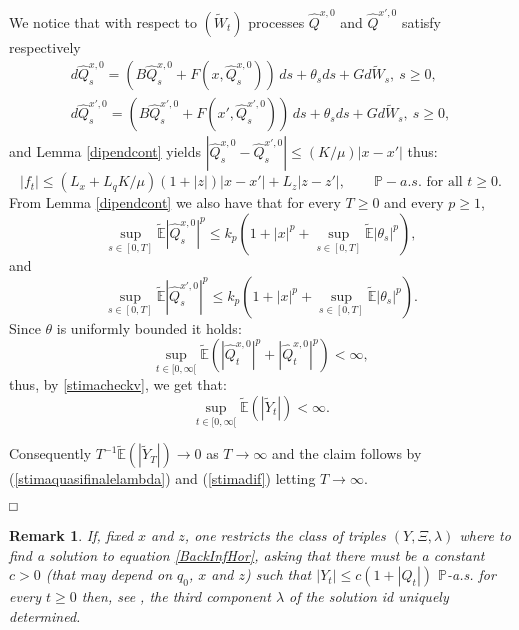 \documentclass[reqno,a4paper,11 pt]{article}
\def \E {\mathbb{E}}
\newtheorem{remark}[theorem]{Remark}
\numberwithin{equation}{section}
\def\finedim{{\hfill\hbox{\enspace${ \square}$}} \smallskip}    %
\def\sqr#1#2{{\vcenter{\vbox{\hrule height .#2pt
     \hbox{\vrule width .#2pt height#1pt \kern#1pt \vrule
     width .#2pt} \hrule height .#2pt}}}}
\def\square{\mathchoice\sqr54\sqr54\sqr{4.1}3\sqr{3.5}3}
\begin{document}
We notice that with respect to $(\widetilde{W}_t)$
processes $\hat{Q}^{x,0}$ and  $\hat{Q}^{x',0}$ satisfy respectively
 \begin{eqnarray*}
 d\hat{Q}^{x,0}_s=(B\hat{Q}^{x,0}_s+ F(x,\hat{Q}_s^{x,0}))\,ds + \theta_s ds+ Gd\widetilde{W}_s, \ s\geq 0,\\
  d\hat{Q}^{x',0}_s=(B\hat{Q}^{x',0}_s+ F(x',\hat{Q}^{x',0}_s))\,ds + \theta_s ds+ Gd\widetilde{W}_s, \ s\geq 0,
 \end{eqnarray*}
 and  Lemma \ref{dipendcont} yields
 $|\hat{Q}^{x,0}_s-\hat{Q}^{x',0}_s|\leq (K/\mu) |x-x'|$ thus:
 \begin{equation}\label{stimadif}
| f_t|\leq (L_x+L_q K/\mu)(1+|z|)|x-x'|+L_z|z-z'|,\qquad \mathbb{P}-a.s. \text{ for all }t \geq 0.
 \end{equation}
 From Lemma \ref{dipendcont}  we also have that for every $T \geq 0$  and every $p\geq 1$,
 \begin{equation}
\sup_{s\in [0,T]}\widetilde{\E} |\hat{Q}^{x,0}_s|^p \leq k_p(1+ |x|^p +\sup_{s\in [0,T]}\widetilde{\E}|\theta_s|^p), 
\end{equation}
and 
 \begin{equation}\label{stimadip}
\sup_{s\in [0,T]}\widetilde{\E} |\hat{Q}^{x',0}_s|^p \leq k_p(1+ |x|^p +\sup_{s\in [0,T]}\widetilde{\E}|\theta_s|^p).
\end{equation}
Since $\theta$ is uniformly bounded it holds: 
 $$\displaystyle \sup_{t\in [0,\infty[} \widetilde{\E}(|\hat{Q}^{x,0}_t|^p+|\hat{Q}^{x,0}_t|^p)<\infty, $$
thus, by
 \eqref{stimacheckv}, we get that:
  $$\displaystyle \sup_{t\in [0,\infty[} \widetilde{\E}(|\widetilde{Y}_t|)<\infty.$$ 
  
  Consequently $T^{-1}\widetilde{\E}(|\widetilde{Y}_T|)
 \rightarrow 0$ as $T\rightarrow \infty$ and the claim follows by (\ref{stimaquasifinalelambda}) and (\ref{stimadif}) letting $T\rightarrow \infty$. 




\finedim

\begin{remark}
If, fixed $x$ and $z$, one restricts the class of triples $(Y,\Xi,\lambda)$ where to find a solution to equation \eqref{BackInfHor}, asking that there must be a constant $c>0$ (that may depend on $q_0$, $x$ and $z$) such that  $|Y_t| \leq c (1+ |Q_t|) $   $\mathbb{P}$-a.s. for every $t \geq 0$ then, see \cite[Theorem 4.6]{FuHuTes}, 
 the third component $\lambda$  of the solution id uniquely determined.
\end{remark}
\end{document}

